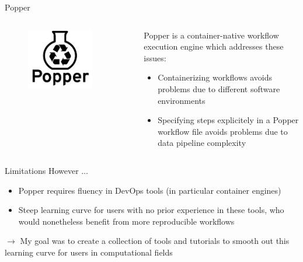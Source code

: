 \documentclass[aspectratio=169, 10pt]{beamer}
\begin{document}
\begin{frame}{Popper}
    \begin{columns}
        \begin{column}{0.5\textwidth}  %
            \begin{center}
                \begin{figure}
                    \includegraphics[width=0.8\textwidth]{images/popper_logo.png}
                \end{figure}
            \end{center}
        \end{column}
        \begin{column}{0.5\textwidth}
            Popper is a container-native workflow execution engine
            which addresses these issues:
            \begin{itemize}
                \item Containerizing workflows avoids problems due to different 
                software environments
                \item Specifying steps explicitely in a Popper workflow file avoids problems due to data pipeline complexity
            \end{itemize}
        \end{column}
    \end{columns}

\end{frame}

\begin{frame}{Limitations}
    However $\ldots$
    \begin{itemize}
        \item  Popper requires fluency in DevOps tools (in particular
        container engines)
        \item Steep learning curve for users with no prior experience in these tools, who would nonetheless benefit from more reproducible workflows
    \end{itemize}
    $\rightarrow$ My goal was to create a collection of tools and tutorials
    to smooth out this learning curve for users in computational fields 
\end{frame}
\end{document}
